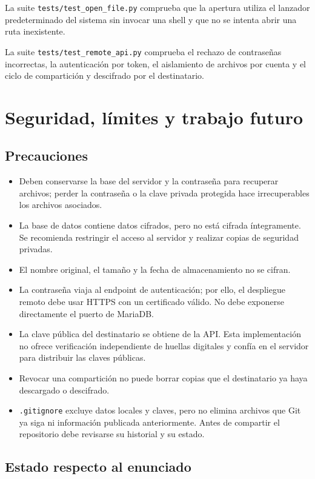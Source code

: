 \documentclass[12pt,a4paper]{article}
\begin{document}
La suite \texttt{tests/test\_open\_file.py} comprueba que la apertura utiliza el lanzador predeterminado del sistema sin invocar una shell y que no se intenta abrir una ruta inexistente.

La suite \texttt{tests/test\_remote\_api.py} comprueba el rechazo de contraseñas incorrectas, la autenticación por token, el aislamiento de archivos por cuenta y el ciclo de compartición y descifrado por el destinatario.

\section{Seguridad, límites y trabajo futuro}

\subsection{Precauciones}

\begin{itemize}
    \item Deben conservarse la base del servidor y la contraseña para recuperar archivos; perder la contraseña o la clave privada protegida hace irrecuperables los archivos asociados.
    \item La base de datos contiene datos cifrados, pero no está cifrada íntegramente. Se recomienda restringir el acceso al servidor y realizar copias de seguridad privadas.
    \item El nombre original, el tamaño y la fecha de almacenamiento no se cifran.
    \item La contraseña viaja al endpoint de autenticación; por ello, el despliegue remoto debe usar HTTPS con un certificado válido. No debe exponerse directamente el puerto de MariaDB.
    \item La clave pública del destinatario se obtiene de la API. Esta implementación no ofrece verificación independiente de huellas digitales y confía en el servidor para distribuir las claves públicas.
    \item Revocar una compartición no puede borrar copias que el destinatario ya haya descargado o descifrado.
    \item \texttt{.gitignore} excluye datos locales y claves, pero no elimina archivos que Git ya siga ni información publicada anteriormente. Antes de compartir el repositorio debe revisarse su historial y su estado.
\end{itemize}

\subsection{Estado respecto al enunciado}
\end{document}
